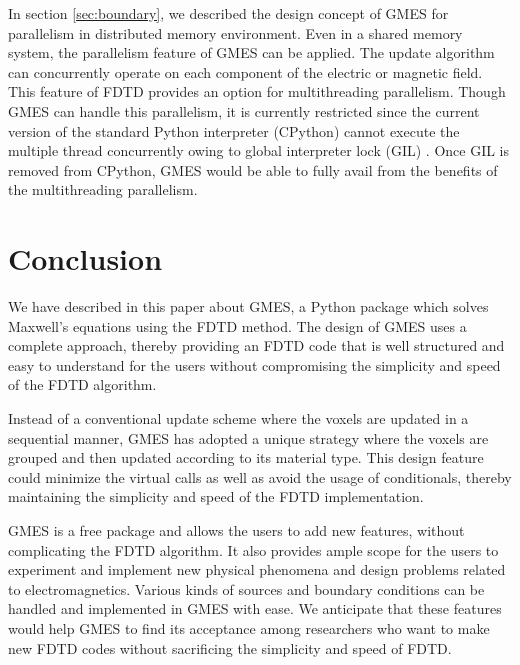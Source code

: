 In section \ref{sec:boundary}, we described the design concept of GMES for parallelism in distributed memory environment. Even in a shared memory system, the parallelism feature of GMES can be applied. The update algorithm can concurrently operate on each component of the electric or magnetic field. This feature of FDTD provides an option for multithreading parallelism. Though GMES can handle this parallelism, it is currently restricted since the current version of the standard Python interpreter (CPython) cannot execute the multiple thread concurrently owing to global interpreter lock (GIL) \cite{lutz_programming_2011}. Once GIL is removed from CPython, GMES would be able to fully avail from the benefits of the multithreading parallelism.

\section{Conclusion}
\label{sec:conclusion}
We have described in this paper about GMES, a Python package which solves Maxwell's equations using the FDTD method. The design of GMES uses a complete  approach, thereby providing an FDTD code that is well structured and easy to understand for the users without compromising the simplicity and speed of the FDTD algorithm.

Instead of a conventional update scheme where the voxels are updated in a sequential manner, GMES has adopted a unique strategy where the voxels are grouped and then updated according to its material type. This design feature could minimize the virtual calls as well as avoid the usage of conditionals, thereby maintaining the simplicity and speed of the FDTD implementation. 

GMES is a free package and allows the users to add new features, without complicating the FDTD algorithm. It also  provides ample scope for the users to experiment and implement new physical phenomena and design problems related to electromagnetics. Various kinds of sources and boundary conditions can be handled and implemented in GMES with ease. We anticipate that these features would help GMES to find its acceptance among researchers who want to make new FDTD codes without sacrificing the simplicity and speed of FDTD.
